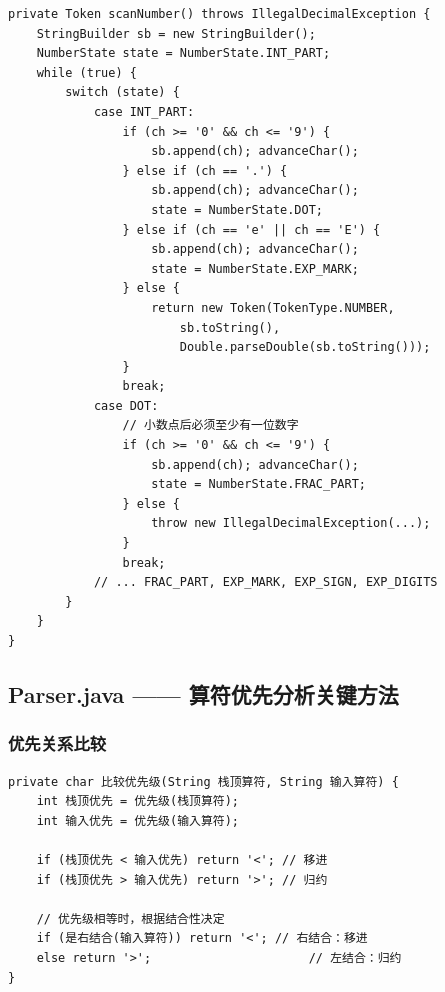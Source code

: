 \documentclass[a4paper]{article}
\begin{document}
\begin{lstlisting}[caption={数值扫描 DFA（scanNumber 方法）}, label={lst:scanNumber}]
private Token scanNumber() throws IllegalDecimalException {
    StringBuilder sb = new StringBuilder();
    NumberState state = NumberState.INT_PART;
    while (true) {
        switch (state) {
            case INT_PART:
                if (ch >= '0' && ch <= '9') {
                    sb.append(ch); advanceChar();
                } else if (ch == '.') {
                    sb.append(ch); advanceChar();
                    state = NumberState.DOT;
                } else if (ch == 'e' || ch == 'E') {
                    sb.append(ch); advanceChar();
                    state = NumberState.EXP_MARK;
                } else {
                    return new Token(TokenType.NUMBER,
                        sb.toString(),
                        Double.parseDouble(sb.toString()));
                }
                break;
            case DOT:
                // 小数点后必须至少有一位数字
                if (ch >= '0' && ch <= '9') {
                    sb.append(ch); advanceChar();
                    state = NumberState.FRAC_PART;
                } else {
                    throw new IllegalDecimalException(...);
                }
                break;
            // ... FRAC_PART, EXP_MARK, EXP_SIGN, EXP_DIGITS
        }
    }
}
\end{lstlisting}

\subsection{Parser.java —— 算符优先分析关键方法}

\subsubsection{优先关系比较}

\begin{lstlisting}[caption={优先级与结合性判断}, label={lst:compare}]
private char 比较优先级(String 栈顶算符, String 输入算符) {
    int 栈顶优先 = 优先级(栈顶算符);
    int 输入优先 = 优先级(输入算符);

    if (栈顶优先 < 输入优先) return '<'; // 移进
    if (栈顶优先 > 输入优先) return '>'; // 归约

    // 优先级相等时，根据结合性决定
    if (是右结合(输入算符)) return '<'; // 右结合：移进
    else return '>';                      // 左结合：归约
}
\end{lstlisting}
\end{document}
